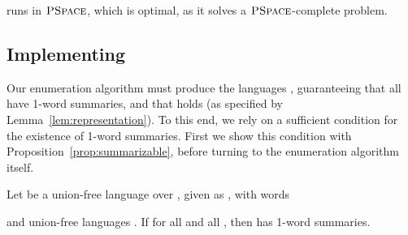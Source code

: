 \documentclass[envcountsame]{llncs}
\newcommand{\PSPACE}{\complexityclass{PSpace}}
\newcommand{\complexityclass}[1]{\ensuremath{\textsc{#1}}\xspace}
\begin{document}
\begin{lemma}[ runs in \PSPACE]
  \label{lem:pspace-completiy-of-prop1-check}
   runs in \PSPACE, which is optimal, as it
  solves a \PSPACE-complete problem.
\end{lemma}



\subsection{Implementing }
\label{sec:impl-lemma-as}

Our enumeration algorithm must produce the languages
, guaranteeing that all
 have 1-word summaries, and that
 holds (as specified by Lemma~\ref{lem:representation}).
To this end, we rely on a sufficient condition for the existence of
1-word summaries.
First we show this condition with Proposition~\ref{prop:summarizable},
before turning to the enumeration algorithm itself.


\begin{proposition}
  \label{prop:summarizable}
  Let  be a union-free language over , given as 
  , with words
   
  and union-free languages .
If  for all  and all , then
   has 1-word summaries.
\end{proposition}



\begin{algorithm}[tbp]
  \; \label{line:intersection}
  \lFor{}{\;}\label{line:iterateunfold}
  \caption{}
  \label{alg:enumeration}
\end{algorithm}

\begin{algorithm}[tbp]
  \Yields{}

  \lIf{}{\Yield{}\;}\label{line:yield}
  \caption{}
  \label{alg:unfold}
\end{algorithm}
\end{document}
